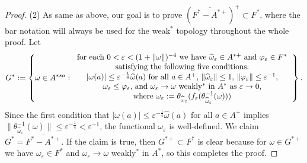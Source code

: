 \documentclass[a4paper]{amsart}
\newcommand{\e}{\varepsilon}
\theoremstyle{plain}
\theoremstyle{definition}
\begin{document}
\begin{proof}
(2)
As same as above, our goal is to prove $(\overline{F^*-A^{*+}})^+\subset F^*$, where the bar notation will always be used for the weak$^*$ topology throughout the whole proof.
Let
\[G^*:=\left\{\omega\in A^{*sa}:\begin{tabular}{c}
for each $0<\e<(1+\|\omega\|)^{-4}$ we have $\widehat\omega_\e\in A^{*+}$ and $\varphi_\e\in F^*$\\
satisfying the following five conditions:\\
$|\omega(a)|\le\e^{-\frac14}\widehat\omega(a)$ for all $a\in A^+$, $\|\widehat\omega_\e\|\le1$, $\|\varphi_\e\|\le\e^{-1}$,\\
$\omega_\e\le\varphi_\e$, and $\omega_\e\to\omega$ weakly$^*$ in $A^*$ as $\e\to0$,\\
where $\omega_\e:=\theta_{\widehat\omega_\e}(f_\e(\theta_{\widehat\omega_\e}^{-1}(\omega)))$
\end{tabular}\right\}.\]
Since the first condition that $|\omega(a)|\le\e^{-\frac14}\widehat\omega(a)$ for all $a\in A^+$ implies $\|\theta_{\widehat\omega_\e}^{-1}(\omega)\|\le\e^{-\frac14}<\e^{-1}$, the functional $\omega_\e$ is well-defined.
We claim $G^*=\overline{F^*-A^{*+}}$.
If the claim is true, then $G^{*+}\subset F^*$ is clear because for $\omega\in G^{*+}$ we have $\omega_\e\in F^*$ and $\omega_\e\to\omega$ weakly$^*$ in $A^*$, so this completes the proof.


\end{proof}
\end{document}
